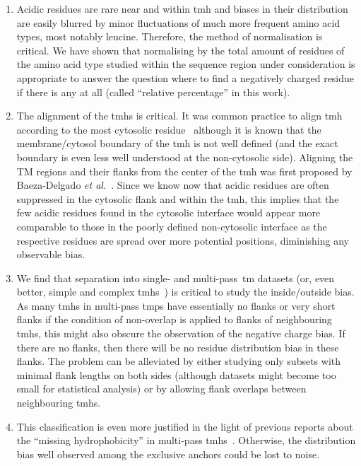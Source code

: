 \begin{enumerate}[i]
  \item Acidic residues are rare near and within \gls{tmh} and biases in their distribution are easily blurred by minor fluctuations of much more frequent amino acid types, most notably leucine.
Therefore, the method of normalisation is critical.
We have shown that normalising by the total amount of residues of the amino acid type studied within the sequence region under consideration is appropriate to answer the question where to find a negatively charged residue if there is any at all (called ``relative percentage'' in this work).
  \item The alignment of the \gls{tmh}s is critical.
It was common practice to align \gls{tmh} according to the most cytosolic residue~\cite{Sharpe2010} although it is known that the membrane/cytosol boundary of the \gls{tmh} is not well defined (and the exact boundary is even less well understood at the non-cytosolic side).
Aligning the TM regions and their flanks from the center of the \gls{tmh} was first proposed by Baeza-Delgado \textit{et al.}~\cite{Baeza-Delgado2013}.
Since we know now that acidic residues are often suppressed in the cytosolic flank and within the \gls{tmh}, this implies that the few acidic residues found in the cytosolic interface would appear more comparable to those in the poorly defined non-cytosolic interface as the respective residues are spread over more potential positions, diminishing any observable bias.
  \item We find that separation into single- and multi-pass~\gls{tm} datasets (or, even better, simple and complex \gls{tmh}s~\cite{Wong2011, Wong2012}) is critical to study the inside/outside bias.
As many \gls{tmh}s in multi-pass \gls{tmp}s have essentially no flanks or very short flanks if the condition of non-overlap is applied to flanks of neighbouring \gls{tmh}s, this might also obscure the observation of the negative charge bias.
If there are no flanks, then there will be no residue distribution bias in these flanks.
The problem can be alleviated by either studying only subsets with minimal flank lengths on both sides (although datasets might become too small for statistical analysis) or by allowing flank overlaps between neighbouring \gls{tmh}s.
  \item This classification is even more justified in the light of previous reports about the ``missing hydrophobicity'' in multi-pass \gls{tmh}s~\cite{Nilsson1990, Hedin2010, Hessa2007, Ojemalm2012}.
Otherwise, the distribution bias well observed among the exclusive anchors could be lost to noise.

\end{enumerate}
